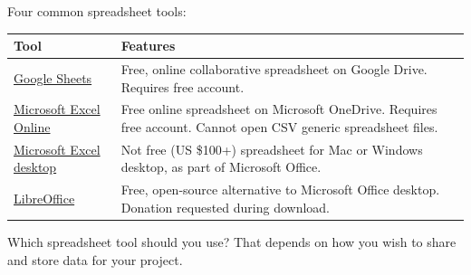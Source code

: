 \documentclass[
  english,
]{book}
\begin{document}
Four common spreadsheet tools:

\begin{longtable}[]{@{}ll@{}}
\toprule
\begin{minipage}[b]{0.47\columnwidth}\raggedright
Tool\strut
\end{minipage} & \begin{minipage}[b]{0.47\columnwidth}\raggedright
Features\strut
\end{minipage}\tabularnewline
\midrule
\endhead
\begin{minipage}[t]{0.47\columnwidth}\raggedright
\href{https://www.google.com/sheets/about/}{Google Sheets}\strut
\end{minipage} & \begin{minipage}[t]{0.47\columnwidth}\raggedright
Free, online collaborative spreadsheet on Google Drive. Requires free account.\strut
\end{minipage}\tabularnewline
\begin{minipage}[t]{0.47\columnwidth}\raggedright
\href{https://office.live.com/start/Excel.aspx}{Microsoft Excel Online}\strut
\end{minipage} & \begin{minipage}[t]{0.47\columnwidth}\raggedright
Free online spreadsheet on Microsoft OneDrive. Requires free account. Cannot open CSV generic spreadsheet files.\strut
\end{minipage}\tabularnewline
\begin{minipage}[t]{0.47\columnwidth}\raggedright
\href{https://products.office.com/en-us/excel}{Microsoft Excel desktop}\strut
\end{minipage} & \begin{minipage}[t]{0.47\columnwidth}\raggedright
Not free (US \$100+) spreadsheet for Mac or Windows desktop, as part of Microsoft Office.\strut
\end{minipage}\tabularnewline
\begin{minipage}[t]{0.47\columnwidth}\raggedright
\href{http://www.libreoffice.org}{LibreOffice}\strut
\end{minipage} & \begin{minipage}[t]{0.47\columnwidth}\raggedright
Free, open-source alternative to Microsoft Office desktop. Donation requested during download.\strut
\end{minipage}\tabularnewline
\bottomrule
\end{longtable}

Which spreadsheet tool should you use? That depends on how you wish to share and store data for your project.
\end{document}
